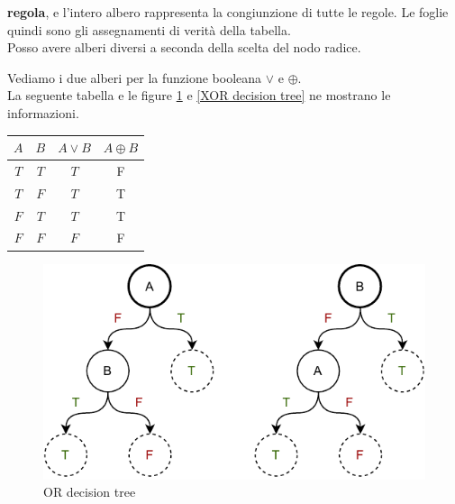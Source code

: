 \textbf{regola}, e l'intero albero rappresenta la congiunzione di tutte le
regole. Le foglie quindi sono gli assegnamenti di verità della tabella.\\ 
Posso avere alberi diversi a seconda della scelta del nodo radice.\\
\begin{esempio}
  Vediamo i due alberi per la funzione booleana $\lor$ e $\oplus$.\\
  La seguente tabella e le figure \ref{OR decision tree} e \ref{XOR decision tree} ne mostrano le informazioni.
  \begin{table}[H]
    \centering
    \begin{tabular}{c|c|c|c}
      $A$ & $B$ & $A\lor B$ & $A\oplus B$ \\
      \hline
      $T$ & $T$ & $T$ & F\\
      $T$ & $F$ & $T$ & T\\
      $F$ & $T$ & $T$ & T\\
      $F$ & $F$ & $F$ & F
    \end{tabular}
  \end{table}
  
  \begin{figure}[h]
    \centering
    \includegraphics[scale = 0.9]{img/dt1.pdf}
    \caption{OR decision tree}
    \label{OR decision tree}
  \end{figure}
 

\end{esempio}
